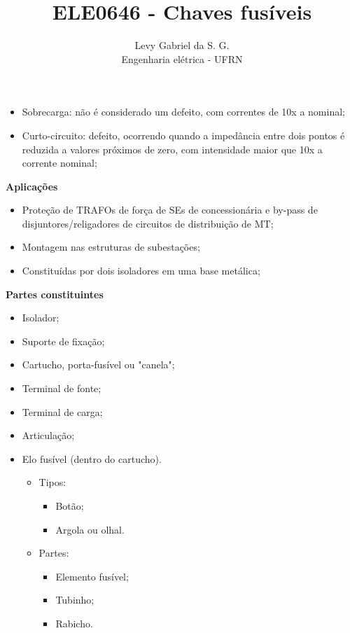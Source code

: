 \title{ELE0646 - Chaves fusíveis}
\author{Levy Gabriel da S. G. \\ Engenharia elétrica - UFRN}

\maketitle
\thispagestyle{fancy}

\begin{itemize}
    \item Sobrecarga: não é considerado um defeito, com correntes de 10x a nominal;
    \item Curto-circuito: defeito, ocorrendo quando a impedância entre dois pontos é reduzida a valores próximos de zero, com intensidade maior que 10x a corrente nominal;
\end{itemize}

\textbf{Aplicações}

\begin{itemize}
    \item Proteção de TRAFOs de força de SEs de concessionária e by-pass de disjuntores/religadores de circuitos de distribuição de MT;
    \item Montagem nas estruturas de subestações;
    \item Constituídas por dois isoladores em uma base metálica;
\end{itemize}

\textbf{Partes constituintes}

\begin{itemize}
    \item Isolador;
    \item Suporte de fixação;
    \item Cartucho, porta-fusível ou "canela";
    \item Terminal de fonte;
    \item Terminal de carga;
    \item Articulação;
    \item Elo fusível (dentro do cartucho).
    \begin{itemize}
        \item Tipos:
        \begin{itemize}
            \item Botão;
            \item Argola ou olhal.
        \end{itemize}
        \item Partes:
        \begin{itemize}
            \item Elemento fusível;
            \item Tubinho;
            \item Rabicho.
        \end{itemize}
    \end{itemize}
\end{itemize}

